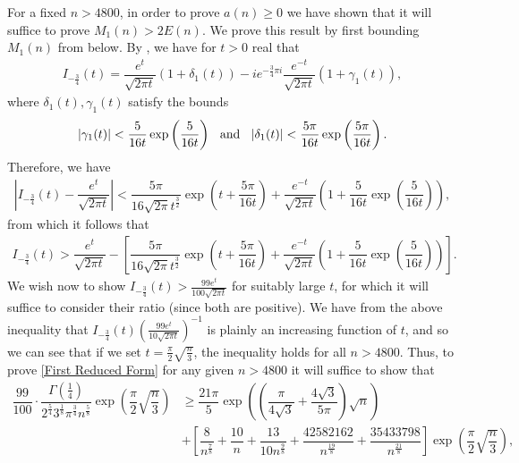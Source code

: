 \documentclass[11pt,reqno]{amsart}
\theoremstyle{definition}
\theoremstyle{plain}
\theoremstyle{named}
\numberwithin{equation}{section}
\theoremstyle{example}
\def\lp{\left(}
\def\rp{\right)}
\begin{document}
For a fixed $n > 4800$, in order to prove $a(n) \geq 0$ we have shown that it will suffice to prove $M_1(n) > 2 E(n)$. We prove this result by first bounding $M_1(n)$ from below. By \cite[Exercise 13.2, pg. 269]{Olver}, we have for $t>0$ real that
\begin{align*}
	I_{-\frac 34}(t) = \dfrac{e^t}{\sqrt{2\pi t}}\lp 1 + \delta_1(t) \rp - i e^{-\frac 34 \pi i} \dfrac{e^{-t}}{\sqrt{2\pi t}} \lp 1 + \gamma_1(t) \rp,
\end{align*}
where $\delta_1(t), \gamma_1(t)$ satisfy the bounds
\begin{align*}
	\left| \gamma_1(t) \right| < \dfrac{5}{16t} \exp\lp \dfrac{5}{16t} \rp \hspace{0.1in} \text{and} \hspace{0.1in} \left| \delta_1(t) \right| < \dfrac{5\pi}{16t} \exp\lp \dfrac{5\pi}{16t} \rp.
\end{align*}
Therefore, we have
\begin{align*}
	\left| I_{-\frac 34}(t) - \dfrac{e^t}{\sqrt{2\pi t}} \right| < \dfrac{5\pi}{16 \sqrt{2\pi} t^{\frac 32}} \exp\lp t + \dfrac{5\pi}{16t} \rp + \dfrac{e^{-t}}{\sqrt{2\pi t}}\lp 1 + \dfrac{5}{16t} \exp\lp \dfrac{5}{16t} \rp \rp,
\end{align*}
from which it follows that
\begin{align*}
	I_{-\frac 34}(t) > \dfrac{e^t}{\sqrt{2\pi t}} - \left[ \dfrac{5\pi}{16 \sqrt{2\pi} t^{\frac 32}} \exp\lp t + \dfrac{5\pi}{16t} \rp + \dfrac{e^{-t}}{\sqrt{2\pi t}}\lp 1 + \dfrac{5}{16t} \exp\lp \dfrac{5}{16t} \rp \rp \right].
\end{align*}
We wish now to show $I_{-\frac 34}(t) > \frac{99 e^t}{100 \sqrt{2\pi t}}$ for suitably large $t$, for which it will suffice to consider their ratio (since both are positive). We have from the above inequality that $I_{-\frac 34}(t) \lp \frac{99e^t}{10\sqrt{2\pi t}} \rp^{-1}$ is plainly an increasing function of $t$, and so we can see that if we set $t = \frac{\pi}{2} \sqrt{\frac{n}{3}}$, the inequality holds for all $n > 4800$. Thus, to prove \eqref{First Reduced Form} for any given $n > 4800$ it will suffice to show that
\begin{align*} 
	\dfrac{99}{100} \cdot \dfrac{\Gamma\lp \frac 14 \rp}{2^{\frac 54} 3^{\frac 18} \pi^{\frac 34} n^{\frac 58}} \exp\lp \dfrac{\pi}{2} \sqrt{\dfrac{n}{3}} \rp &\geq \dfrac{21\pi}{5} \exp\lp \lp \dfrac{\pi}{4\sqrt{3}} + \dfrac{4\sqrt{3}}{5\pi} \rp \sqrt{n} \rp \\ &+ \left[ \dfrac{8}{n^{\frac 78}} + \dfrac{10}{n} + \dfrac{13}{10 n^{\frac 98}} + \dfrac{42582162}{n^{\frac{19}{8}}} + \dfrac{35433798}{n^{\frac{21}{8}}} \right] \exp\lp \dfrac{\pi}{2} \sqrt{\dfrac{n}{3}} \rp,
\end{align*}
\end{document}
